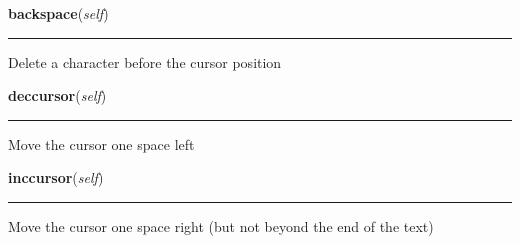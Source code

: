 \hspace{.8\funcindent}\begin{boxedminipage}{\funcwidth}

    \raggedright \textbf{backspace}(\textit{self})

    \vspace{-1.5ex}

    \rule{\textwidth}{0.5\fboxrule}
\setlength{\parskip}{2ex}
    Delete a character before the cursor position

\setlength{\parskip}{1ex}
    \end{boxedminipage}

    \label{pygame-asteroids:virtual_keyboard:TextInput:deccursor}

    \vspace{0.5ex}

\hspace{.8\funcindent}\begin{boxedminipage}{\funcwidth}

    \raggedright \textbf{deccursor}(\textit{self})

    \vspace{-1.5ex}

    \rule{\textwidth}{0.5\fboxrule}
\setlength{\parskip}{2ex}
    Move the cursor one space left

\setlength{\parskip}{1ex}
    \end{boxedminipage}

    \label{pygame-asteroids:virtual_keyboard:TextInput:inccursor}

    \vspace{0.5ex}

\hspace{.8\funcindent}\begin{boxedminipage}{\funcwidth}

    \raggedright \textbf{inccursor}(\textit{self})

    \vspace{-1.5ex}

    \rule{\textwidth}{0.5\fboxrule}
\setlength{\parskip}{2ex}
    Move the cursor one space right (but not beyond the end of the text)

\setlength{\parskip}{1ex}
    \end{boxedminipage}

